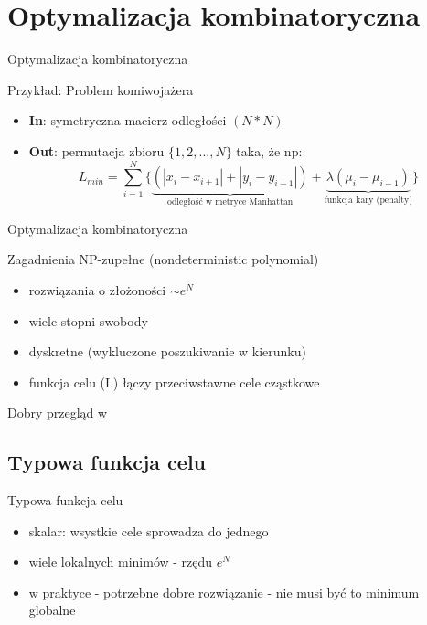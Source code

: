 \section{Optymalizacja kombinatoryczna}

	\begin{frame}{Optymalizacja kombinatoryczna }
		\begin{exampleblock}{Przykład: Problem komiwojażera}
			\begin{itemize}
				\item \textbf{In}: symetryczna macierz odległości $(N*N)$
						
				\item \textbf{Out}: permutacja zbioru $\{1,2,...,N\}$ taka, że np:
					$$
						L_{min} = \sum_{i=1}^N \{ \underbrace{(|x_i - x_{i+1}| + |y_i - y_{i+1}|)}_\text{odległość w metryce Manhattan} + \underbrace{\lambda(\mu_i - \mu_{i-1})}_\text{funkcja kary (penalty)}\}
					$$
			\end{itemize}		
		\end{exampleblock}
		
	\end{frame}

	\begin{frame}{Optymalizacja kombinatoryczna}
		\begin{exampleblock}{Zagadnienia NP-zupełne (nondeterministic polynomial)}
			\begin{itemize}
				\item rozwiązania o złożoności $\sim e^N$
				\item wiele stopni swobody
				\item dyskretne (wykluczone poszukiwanie w kierunku)
				\item funkcja celu (L) łączy przeciwstawne cele cząstkowe			
			\end{itemize}
		\end{exampleblock}
		Dobry przegląd w \cite{garey}
	\end{frame}
	
\subsection{Typowa funkcja celu}
	\begin{frame}{Typowa funkcja celu}
		\begin{itemize}
			\item skalar: wsystkie cele sprowadza do jednego
			\item wiele lokalnych minimów - rzędu $e^N$
			\item w praktyce - potrzebne dobre rozwiązanie - nie musi być to minimum globalne	
		\end{itemize}

	\end{frame}

